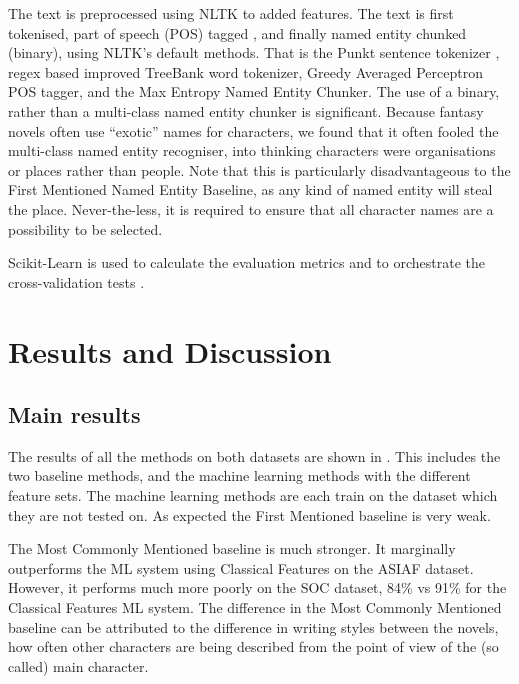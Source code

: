 \documentclass[11pt,a4paper]{article}
\newcommand{\parencite}{\citep}
\begin{document}
The text is preprocessed using NLTK \parencite{NLTK} to added features.
The text is first tokenised, part of speech (POS) tagged , and finally named entity chunked (binary), using NLTK's default methods.
That is the Punkt sentence tokenizer \parencite{kiss2006unsupervised}, regex based improved TreeBank word tokenizer, Greedy Averaged Perceptron POS tagger, and the Max Entropy Named Entity Chunker.
The use of a binary, rather than a multi-class named entity chunker is significant.
Because fantasy novels often use ``exotic'' names for characters, we found that it often  fooled the multi-class named entity recogniser, into thinking characters were organisations or places rather than people.
Note that this is particularly disadvantageous to the First Mentioned Named Entity Baseline, as any kind of named entity will steal the place.
Never-the-less, it is required to ensure that all character names are a possibility to be selected.

Scikit-Learn is used to calculate the evaluation metrics and to orchestrate the cross-validation tests \parencite{scikit-learn}.


\section{Results and Discussion}\label{sec:results-and-discussion}

\subsection{Main results}

\begin{table*}
	\begin{adjustbox}{max width=\textwidth}
	\end{adjustbox}
	
	\caption{} \label{tbl:resmain}
\end{table*}

The results of all the methods on both datasets are shown in .
This includes the two baseline methods, and the machine learning methods with the different feature sets.
The machine learning methods are each train on the dataset which they are not tested on.
As expected the First Mentioned baseline is very weak.

The Most Commonly Mentioned baseline is much stronger.
It marginally outperforms the ML system using Classical Features on the ASIAF dataset.
However, it performs much more poorly on the SOC dataset, 84\% vs 91\% for the Classical Features ML system.
The difference in the Most Commonly Mentioned baseline can be attributed to the difference in writing styles between the novels, how often other characters are being described from the point of view of the (so called) main character.
\end{document}
